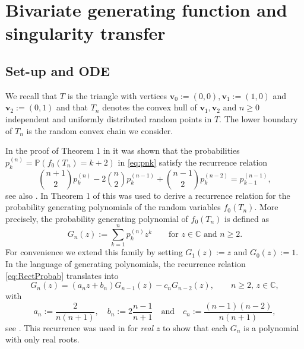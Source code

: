 \documentclass[11pt,a4paper]{article}
\numberwithin{equation}{section}
\def\CC{\mathbb{C}}
\def\PP{\mathbb{P}}
\def\bv{\mathbf{v}}
\begin{document}
\section{Bivariate generating function and singularity transfer}\label{sec:BivariageGF}

\subsection{Set-up and ODE}

We recall that $T$ is the triangle with vertices $\bv_0:=(0,0), \bv_1:=(1,0)$ and $\bv_2:=(0,1)$ and that $T_n$ denotes the convex hull of $\bv_1,\bv_2$ and $n\geq 0$ independent and uniformly distributed random points in $T$. The lower boundary of $T_n$ is the random convex chain we consider.

In the proof of Theorem 1 in \cite{Buchta:2012} it was shown that the probabilities $p_k^{(n)}=\PP(f_0(T_n)=k+2)$ in \eqref{eq:pnk} satisfy the recurrence relation
\begin{equation}\label{eq:RectProbab}
    \binom{n+1}{2} p_k^{(n)} - 2 \binom{n}{2} p_k^{(n-1)}+\binom{n-1}{2} p_k^{(n-2)} = p_{k-1}^{(n-1)},
\end{equation}
see also \cite[Equation (3)]{GT:2021}. In Theorem 1 of \cite{GT:2021} this was used to derive a recurrence relation for the probability generating polynomials of the random variables $f_0(T_n)$. More precisely, the probability generating polynomial of $f_0(T_n)$ is defined as
\begin{equation*}
    G_n(z) := \sum_{k=1}^n p_k^{(n)} z^k \qquad \text{for $z\in\CC$ and $n\geq 2$}.
\end{equation*}  
For convenience we extend this family by setting $G_1(z):=z$ and $G_0(z):=1$. In the language of generating polynomials, the recurrence relation \eqref{eq:RectProbab} translates into
\begin{equation}\label{eq:RectGF}
    G_n(z) = (a_n z+ b_n) G_{n-1}(z) - c_n G_{n-2}(z), \qquad \text{$n\geq 2$, $z\in\CC$},
\end{equation}
with
\begin{equation*}
    a_n := \frac{2}{n(n+1)}, \quad b_n := 2\frac{n-1}{n+1}\quad \text{and} \quad c_n := \frac{(n-1)(n-2)}{n(n+1)},
\end{equation*}
see \cite[Theorem 1]{GT:2021}. This recurrence was used in \cite{GT:2021} for \textit{real} $z$ to show that each $G_n$ is a polynomial with only real roots.
\end{document}

